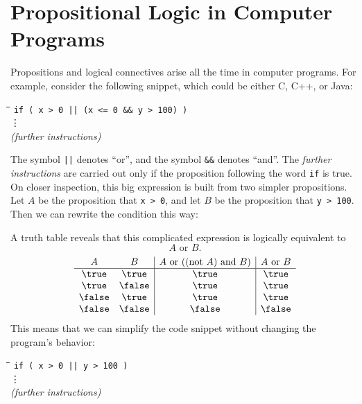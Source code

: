 \begin{problems}
\classproblems
{}
\homeworkproblems
{}
\end{problems}

\section{Propositional Logic in Computer Programs}

Propositions and logical connectives arise all the time in computer
programs.  For example, consider the following snippet, which could be
either C, C++, or Java:
%
\begin{tabbing}
\hspace{1in} \= \quad\quad \= \quad\quad \= \quad\quad \= \kill
\> \texttt{if ( x > 0 || (x <= 0 \&\& y > 100) )} \\
\> \> \vdots\\
\> \textit{(further instructions)}
\end{tabbing}
%
The symbol \texttt{||} denotes ``or'', and the symbol \texttt{\&\&}
denotes ``and''.  The \textit{further instructions} are carried out
only if the proposition following the word \texttt{if} is true.  On
closer inspection, this big expression is built from two simpler
propositions.  Let $A$ be the proposition that \texttt{x > 0}, and let
$B$ be the proposition that \texttt{y > 100}.  Then we can rewrite the
condition this way:
%
%
A truth table reveals that this complicated expression is logically
equivalent to 
\begin{equation}\label{AOB}
A \text{ or } B.
\end{equation}
%
\[
\begin{array}{cc|c|c}
A & B &
    A \text{ or } ((\text{not } A) \text{ and } B) &
    A \text{ or } B \\ \hline
\true & \true & \true & \true \\
\true & \false & \true & \true \\
\false & \true & \true & \true \\
\false & \false & \false & \false
\end{array}
\]
%
This means that we can simplify the code snippet without changing the
program's behavior:
%
\begin{tabbing}
\hspace{1in} \= \quad\quad \= \quad\quad \= \quad\quad \= \kill
\> \texttt{if ( x > 0 || y > 100 )} \\
\> \> \vdots\\
\> \textit{(further instructions)}
\end{tabbing}

